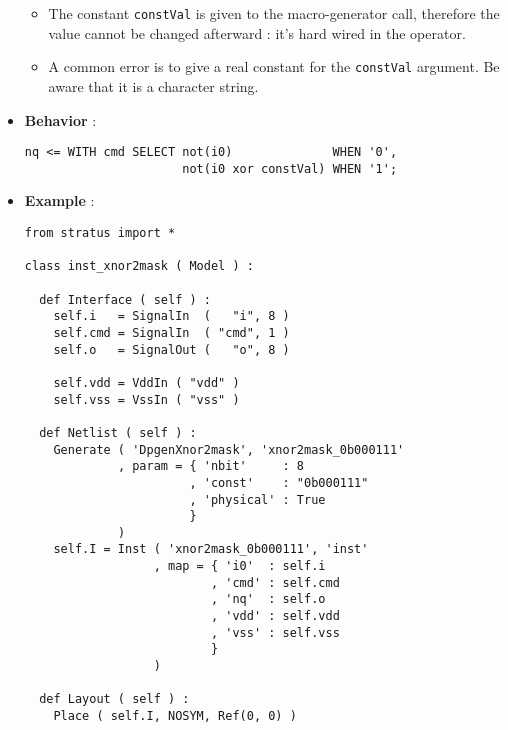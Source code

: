 \begin{itemize}
\begin{itemize}
        \item The constant \verb-constVal- is given to the macro-generator call, therefore the value cannot be changed afterward : it's hard wired in the operator.
        \item A common error is to give a real constant for the \verb-constVal- argument. Be aware that it is a character string.
    \end{itemize}    
    \item \textbf{Behavior} :
\begin{verbatim}
nq <= WITH cmd SELECT not(i0)              WHEN '0',
                      not(i0 xor constVal) WHEN '1';
\end{verbatim}
    \item \textbf{Example} :
\begin{verbatim}
from stratus import *

class inst_xnor2mask ( Model ) :

  def Interface ( self ) :
    self.i   = SignalIn  (   "i", 8 )
    self.cmd = SignalIn  ( "cmd", 1 )
    self.o   = SignalOut (   "o", 8 )

    self.vdd = VddIn ( "vdd" )
    self.vss = VssIn ( "vss" )
    
  def Netlist ( self ) :
    Generate ( 'DpgenXnor2mask', 'xnor2mask_0b000111'
             , param = { 'nbit'     : 8
                       , 'const'    : "0b000111"
                       , 'physical' : True
                       }
             )
    self.I = Inst ( 'xnor2mask_0b000111', 'inst'
                  , map = { 'i0'  : self.i
                          , 'cmd' : self.cmd
                          , 'nq'  : self.o
                          , 'vdd' : self.vdd
                          , 'vss' : self.vss
                          }
                  )
    
  def Layout ( self ) :
    Place ( self.I, NOSYM, Ref(0, 0) )
\end{verbatim}
\end{itemize}
